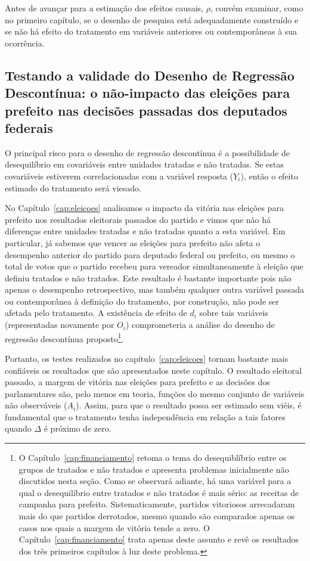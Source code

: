 Antes de avançar para a estimação dos efeitos causais, $\rho$, convém examinar, como no primeiro capítulo, se o desenho de pesquisa está adequadamente construído e se não há efeito do tratamento em variáveis anteriores ou contemporâneas à sua ocorrência.

\subsection{Testando a validade do Desenho de Regressão Descontínua: o não-impacto das eleições para prefeito nas decisões passadas dos deputados federais}

O principal risco para o desenho de regressão descontínua é a possibilidade de desequilíbrio em covariáveis entre unidades tratadas e não tratadas. Se estas covariáveis estiverem correlacionadas com a variável resposta ($Y_{i}$), então o efeito estimado do tratamento será viesado.

No Capítulo~\ref{cap:eleicoes} analisamos o impacto da vitória nas eleições para prefeito nos resultados eleitorais passados do partido e vimos que não há diferenças entre unidades tratadas e não tratadas quanto a esta variável. Em particular, já sabemos que vencer as eleições para prefeito não afeta o desempenho anterior do partido para deputado federal ou prefeito, ou mesmo o total de votos que o partido recebeu para vereador simultaneamente à eleição que definiu tratados e não tratados. Este resultado é bastante importante pois não apenas o desempenho retrospectivo, mas também qualquer outra variável passada ou contemporânea à definição do tratamento, por construção, não pode ser afetada pelo tratamento. A existência de efeito de $d_{i}$ sobre tais variáveis (representadas novamente por $O_{i}$) comprometeria a análise do desenho de regressão descontínua proposto\footnote{O Capítulo~\ref{cap:financiamento} retoma o tema do desequiblíbrio entre os grupos de tratados e não tratados e apresenta problemas inicialmente não discutidos nesta seção. Como se observará adiante, há uma variável para a qual o desequilíbrio entre tratados e não tratados é mais sério: as receitas de campanha para prefeito. Sistematicamente, partidos vitoriosos arrecadaram mais do que partidos derrotados, mesmo quando são comparados apenas os casos nos quais a margem de vitória tende a zero. O Capítulo~\ref{cap:financiamento} trata apenas deste assunto e revê os resultados dos três primeiros capítulos à luz deste problema.}.

Portanto, os testes realizados no capítulo~\ref{cap:eleicoes} tornam bastante mais confiáveis os resultados que são apresentados neste capítulo. O resultado eleitoral passado, a margem de vitória nas eleições para prefeito e as decisões dos parlamentares são, pelo menos em teoria, funções do mesmo conjunto de variáveis não observáveis ($A_{i}$). Assim, para que o resultado possa ser estimado sem viéis, é fundamental que o tratamento tenha independência em relação a tais fatores quando $\Delta$ é próximo de zero.

